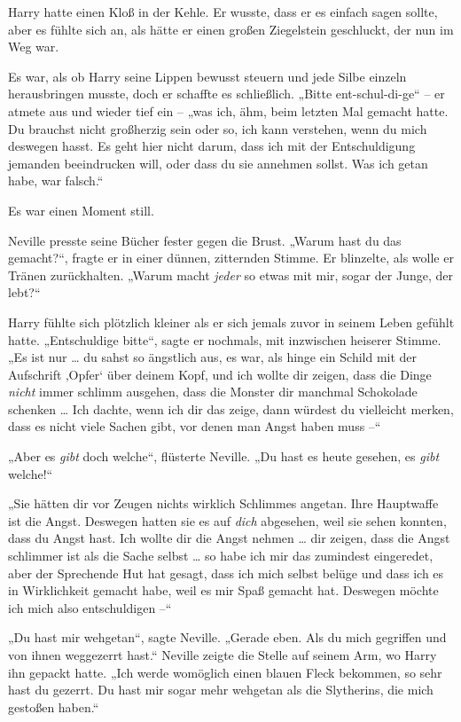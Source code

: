 {Harry hatte einen Kloß in der Kehle. Er wusste, dass er es einfach sagen sollte, aber es fühlte sich an, als hätte er einen großen Ziegelstein geschluckt, der nun im Weg war.

Es war, als ob Harry seine Lippen bewusst steuern und jede Silbe einzeln herausbringen musste, doch er schaffte es schließlich. „Bitte ent-schul-di-ge“ -- er atmete aus und wieder tief ein -- „was ich, ähm, beim letzten Mal gemacht hatte. Du brauchst nicht großherzig sein oder so, ich kann verstehen, wenn du mich deswegen hasst. Es geht hier nicht darum, dass ich mit der Entschuldigung jemanden beeindrucken will, oder dass du sie annehmen sollst. Was ich getan habe, war falsch.“

Es war einen Moment still.

Neville presste seine Bücher fester gegen die Brust. „Warum hast du das gemacht?“, fragte er in einer dünnen, zitternden Stimme. Er blinzelte, als wolle er Tränen zurückhalten. „Warum macht \emph{jeder} so etwas mit mir, sogar der Junge, der lebt?“

Harry fühlte sich plötzlich kleiner als er sich jemals zuvor in seinem Leben gefühlt hatte. „Entschuldige bitte“, sagte er nochmals, mit inzwischen heiserer Stimme. „Es ist nur … du sahst so ängstlich aus, es war, als hinge ein Schild mit der Aufschrift ‚Opfer` über deinem Kopf, und ich wollte dir zeigen, dass die Dinge \emph{nicht} immer schlimm ausgehen, dass die Monster dir manchmal Schokolade schenken … Ich dachte, wenn ich dir das zeige, dann würdest du vielleicht merken, dass es nicht viele Sachen gibt, vor denen man Angst haben muss --“

„Aber es \emph{gibt} doch welche“, flüsterte Neville. „Du hast es heute gesehen, es \emph{gibt} welche!“

„Sie hätten dir vor Zeugen nichts wirklich Schlimmes angetan. Ihre Hauptwaffe ist die Angst. Deswegen hatten sie es auf \emph{dich} abgesehen, weil sie sehen konnten, dass du Angst hast. Ich wollte dir die Angst nehmen … dir zeigen, dass die Angst schlimmer ist als die Sache selbst … so habe ich mir das zumindest eingeredet, aber der Sprechende Hut hat gesagt, dass ich mich selbst belüge und dass ich es in Wirklichkeit gemacht habe, weil es mir Spaß gemacht hat. Deswegen möchte ich mich also entschuldigen --“

„Du hast mir wehgetan“, sagte Neville. „Gerade eben. Als du mich gegriffen und von ihnen weggezerrt hast.“ Neville zeigte die Stelle auf seinem Arm, wo Harry ihn gepackt hatte. „Ich werde womöglich einen blauen Fleck bekommen, so sehr hast du gezerrt. Du hast mir sogar mehr wehgetan als die Slytherins, die mich gestoßen haben.“

}
